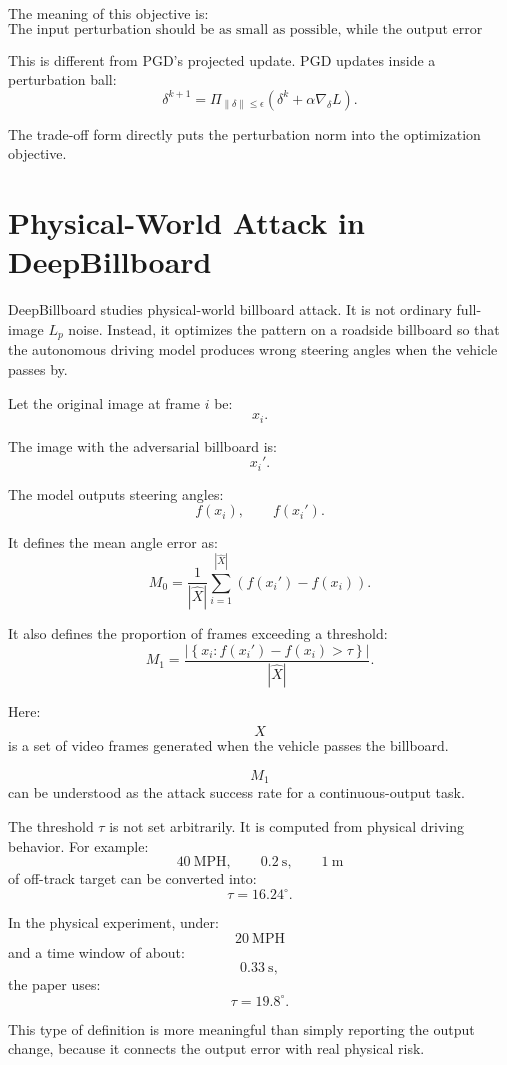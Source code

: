 \documentclass{article}
\begin{document}
The meaning of this objective is:
\[
\text{The input perturbation should be as small as possible, while the output error should be as large as possible.}
\]

This is different from PGD's projected update. PGD updates inside a perturbation ball:
\[
\delta^{k+1}
=
\Pi_{\|\delta\|\leq \epsilon}
\left(
\delta^k+\alpha \nabla_\delta L
\right).
\]

The trade-off form directly puts the perturbation norm into the optimization objective.

\section{Physical-World Attack in DeepBillboard}

DeepBillboard studies physical-world billboard attack. It is not ordinary full-image \(L_p\) noise. Instead, it optimizes the pattern on a roadside billboard so that the autonomous driving model produces wrong steering angles when the vehicle passes by.

Let the original image at frame \(i\) be:
\[
x_i.
\]

The image with the adversarial billboard is:
\[
x_i'.
\]

The model outputs steering angles:
\[
f(x_i),\qquad f(x_i').
\]

It defines the mean angle error as:
\[
M_0
=
\frac{1}{|\hat X|}
\sum_{i=1}^{|\hat X|}
\left(
f(x_i')-f(x_i)
\right).
\]

It also defines the proportion of frames exceeding a threshold:
\[
M_1
=
\frac{
\left|
\left\{
x_i:
f(x_i')-f(x_i)>\tau
\right\}
\right|
}{
|\hat X|
}.
\]

Here:
\[
\hat X
\]
is a set of video frames generated when the vehicle passes the billboard.

\[
M_1
\]
can be understood as the attack success rate for a continuous-output task.

The threshold \(\tau\) is not set arbitrarily. It is computed from physical driving behavior. For example:
\[
40\ \mathrm{MPH},
\qquad
0.2\ \mathrm{s},
\qquad
1\ \mathrm{m}
\]
of off-track target can be converted into:
\[
\tau=16.24^\circ.
\]

In the physical experiment, under:
\[
20\ \mathrm{MPH}
\]
and a time window of about:
\[
0.33\ \mathrm{s},
\]
the paper uses:
\[
\tau=19.8^\circ.
\]

This type of definition is more meaningful than simply reporting the output change, because it connects the output error with real physical risk.
\end{document}
